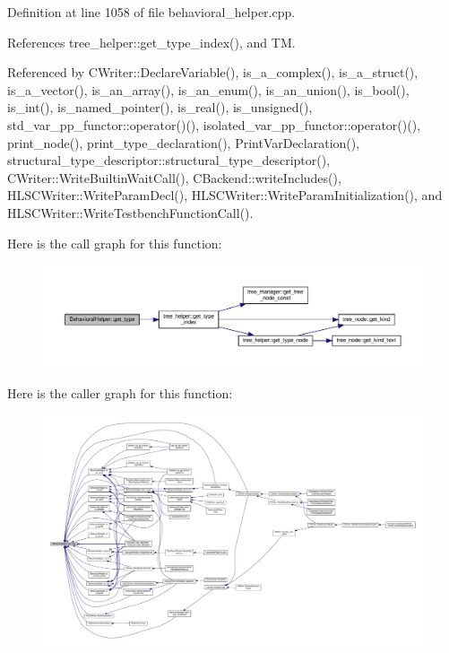 Definition at line 1058 of file behavioral\+\_\+helper.\+cpp.



References tree\+\_\+helper\+::get\+\_\+type\+\_\+index(), and TM.



Referenced by C\+Writer\+::\+Declare\+Variable(), is\+\_\+a\+\_\+complex(), is\+\_\+a\+\_\+struct(), is\+\_\+a\+\_\+vector(), is\+\_\+an\+\_\+array(), is\+\_\+an\+\_\+enum(), is\+\_\+an\+\_\+union(), is\+\_\+bool(), is\+\_\+int(), is\+\_\+named\+\_\+pointer(), is\+\_\+real(), is\+\_\+unsigned(), std\+\_\+var\+\_\+pp\+\_\+functor\+::operator()(), isolated\+\_\+var\+\_\+pp\+\_\+functor\+::operator()(), print\+\_\+node(), print\+\_\+type\+\_\+declaration(), Print\+Var\+Declaration(), structural\+\_\+type\+\_\+descriptor\+::structural\+\_\+type\+\_\+descriptor(), C\+Writer\+::\+Write\+Builtin\+Wait\+Call(), C\+Backend\+::write\+Includes(), H\+L\+S\+C\+Writer\+::\+Write\+Param\+Decl(), H\+L\+S\+C\+Writer\+::\+Write\+Param\+Initialization(), and H\+L\+S\+C\+Writer\+::\+Write\+Testbench\+Function\+Call().

Here is the call graph for this function\+:
\nopagebreak
\begin{figure}[H]
\begin{center}
\leavevmode
\includegraphics[width=350pt]{dd/db2/classBehavioralHelper_a00e1217fcbbe785c40ed9aa289fbe4df_cgraph}
\end{center}
\end{figure}
Here is the caller graph for this function\+:
\nopagebreak
\begin{figure}[H]
\begin{center}
\leavevmode
\includegraphics[width=350pt]{dd/db2/classBehavioralHelper_a00e1217fcbbe785c40ed9aa289fbe4df_icgraph}
\end{center}
\end{figure}
\mbox{\label{classBehavioralHelper_ad7b32825859d731ce27077af3c130ea0}} 
